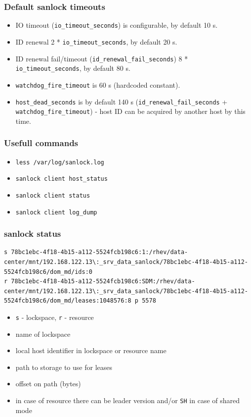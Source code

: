\documentclass[10pt,utf8]{beamer}
\begin{document}
\begin{frame}
  \frametitle{Default sanlock timeouts}
  \begin{itemize}
    \item IO timeout (\texttt{io\_timeout\_seconds}) is configurable,  by default 10 s.
    \item ID renewal 2 * \texttt{io\_timeout\_seconds}, by default 20 s.
    \item ID renewal fail/timeout (\texttt{id\_renewal\_fail\_seconds}) 8 * \texttt{io\_timeout\_seconds}, by default 80 s.
  \end{itemize}
  \vspace{0.5cm}
  \begin{itemize}
    \item \texttt{watchdog\_fire\_timeout} is 60 s (hardcoded constant).
    \item \texttt{host\_dead\_seconds} is by default 140 s (\texttt{id\_renewal\_fail\_seconds} + \texttt{watchdog\_fire\_timeout}) - host ID can be acquired by another host by this time.
  \end{itemize}
\end{frame}

\begin{frame}
    \frametitle{Usefull commands}
    \begin{itemize}
        \item \texttt{less /var/log/sanlock.log}
        \item \texttt{sanlock client host\_status}
        \item \texttt{sanlock client status}
        \item \texttt{sanlock client log\_dump}
    \end{itemize}
\end{frame}

\begin{frame}[fragile]
    \frametitle{sanlock status}
    \begin{lstlisting}[style=log]
s 78bc1ebc-4f18-4b15-a112-5524fcb198c6:1:/rhev/data-center/mnt/192.168.122.13\:_srv_data_sanlock/78bc1ebc-4f18-4b15-a112-5524fcb198c6/dom_md/ids:0
r 78bc1ebc-4f18-4b15-a112-5524fcb198c6:SDM:/rhev/data-center/mnt/192.168.122.13\:_srv_data_sanlock/78bc1ebc-4f18-4b15-a112-5524fcb198c6/dom_md/leases:1048576:8 p 5578
    \end{lstlisting}
    
    \begin{itemize}
        \item \texttt{s} - lockspace, \texttt{r} - resource
        \item name of lockspace
        \item local host identifier in lockspace or resource name
        \item path to storage to use for leases
        \item offset on path (bytes)
        \item in case of resource there can be leader version and/or \texttt{SH} in case of shared mode
    \end{itemize}
\end{frame}
\end{document}
